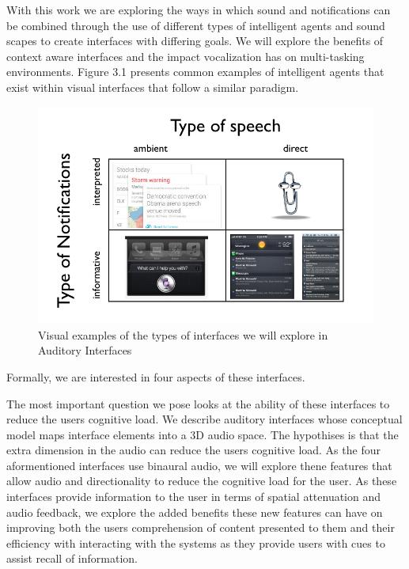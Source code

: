 With this work we are exploring the ways in which sound and notifications can be
combined through the use of different types of intelligent agents and sound
scapes to create interfaces with differing goals.  We will explore the benefits
of context aware interfaces and the impact vocalization has on multi-tasking
environments. Figure 3.1 presents common examples of intelligent agents that
exist within visual interfaces that follow a similar paradigm.

\begin{figure}[h]
  \centering
  \includegraphics[width=1\textwidth]{images/chart.png}
  \caption{Visual examples of the types of interfaces we will explore in Auditory
  Interfaces}
\end{figure}

Formally, we are interested in four  aspects of these interfaces.

The most important question we pose looks at the ability of these interfaces to reduce
the users cognitive load. We describe auditory interfaces whose conceptual model
maps interface elements into a 3D audio space. The hypothises is that the extra dimension in the audio
can reduce the users cognitive load. As the four aformentioned interfaces use
binaural audio, we will explore thene features that allow audio and directionality
to reduce the cognitive load for the user. As these interfaces provide information to the user
in terms of spatial attenuation and audio feedback, we explore the added benefits
these new features can have on improving both the users comprehension of content
presented to them and their efficiency with interacting with the systems as they
provide users with cues to assist recall of information.

